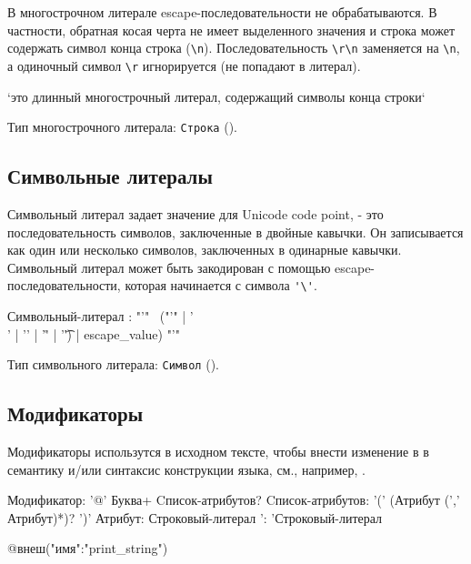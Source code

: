 В многострочном литерале escape-последовательности не обрабатываются.
В частности, обратная косая черта не имеет выделенного значения и строка может содержать символ конца строка (\verb+\n+).
Последовательность \verb+\r\n+ заменяется на \verb+\n+, а одиночный символ \verb+\r+ игнорируется (не попадают в литерал).

\begin{Trivil}
`это длинный
многострочный литерал,
содержащий символы конца строки`
\end{Trivil}

Тип многострочного  литерала: \verb+Строка+ (). 

\hypertarget{symlit}{%
\subsection{Символьные литералы}\label{lex:symlit}}

Символьный литерал задает значение для Unicode code point, - это последовательность символов, заключенные в двойные кавычки.
Он записывается как один или несколько символов, заключенных в одинарные кавычки. Символьный литерал может быть закодирован с помощью escape-последовательности, которая начинается с символа \verb+'\'+.

\begin{Grammar}
Символьный-литерал
    : "'" 
    ~("'" | '\\' | '\n' | '\r' | '\t') | escape_value)
    "'"
\end{Grammar}  

Тип символьного литерала: \verb+Символ+ (). 

\hypertarget{modifiers}{%
\subsection{Модификаторы}\label{lex:modifiers}}

Модификаторы использутся в исходном тексте, чтобы внести изменение в в семантику и/или синтаксис конструкции языка, см., например, .

\begin{Grammar}
Модификатор: '@' Буква+ Cписок-атрибутов?
Cписок-атрибутов: '(' (Атрибут (',' Атрибут)*)? ')'
Атрибут: Строковый-литерал ': 'Строковый-литерал
\end{Grammar}  

\begin{Trivil}
@внеш("имя":"print_string")
\end{Trivil}